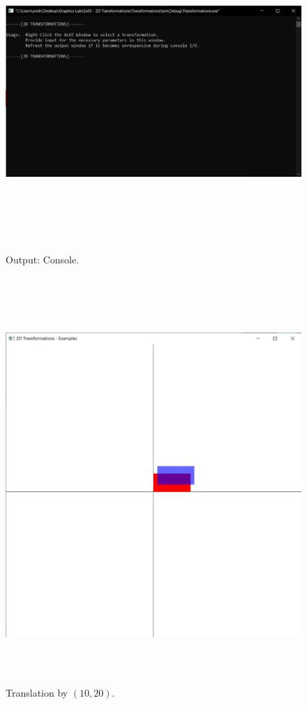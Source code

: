 \documentclass[12pt, a4]{article}
\begin{document}
\subsection*{}
\begin{figure}[h]
\centering
\caption{Output: Console.}
\includegraphics[height=12cm, width=17cm]{Outputs/Console-1.png}
\end{figure}

\newpage
\subsection*{}
\begin{figure}[h]
\centering
\caption{Translation by $(10, 20)$.}
\includegraphics[height=15cm, width=15cm]{Outputs/Output-2.png}
\end{figure}
\end{document}
